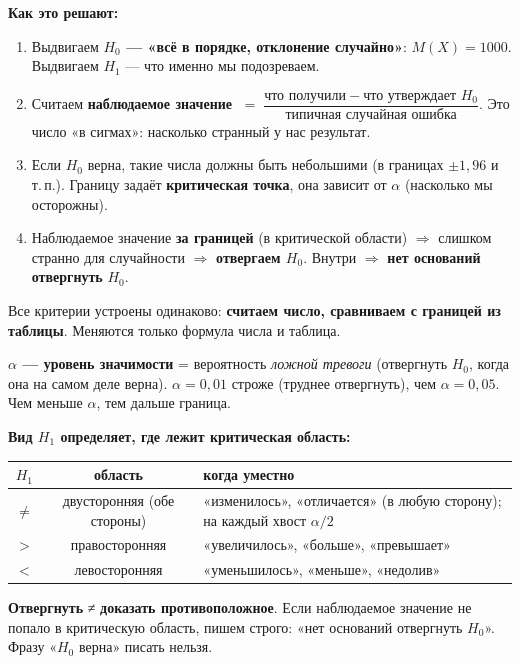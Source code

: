 \documentclass[a4paper,11pt]{extarticle}
\begin{document}
\textbf{Как это решают:}
\begin{enumerate}
\item Выдвигаем \textbf{$H_0$ --- «всё в порядке, отклонение случайно»}: $M(X)=1000$. Выдвигаем $H_1$ --- что именно мы подозреваем.
\item Считаем \textbf{наблюдаемое значение} $\;=\;\dfrac{\text{что получили}-\text{что утверждает }H_0}{\text{типичная случайная ошибка}}$. Это число «в сигмах»: насколько странный у нас результат.
\item Если $H_0$ верна, такие числа должны быть небольшими (в границах $\pm1{,}96$ и т.\,п.). Границу задаёт \textbf{критическая точка}, она зависит от $\alpha$ (насколько мы осторожны).
\item Наблюдаемое значение \textbf{за границей} (в критической области) $\Rightarrow$ слишком странно для случайности $\Rightarrow$ \textbf{отвергаем $H_0$}. Внутри $\Rightarrow$ \textbf{нет оснований отвергнуть} $H_0$.
\end{enumerate}
\begin{idea}
Все критерии устроены одинаково: \textbf{считаем число, сравниваем с границей из таблицы}. Меняются только формула числа и таблица.
\end{idea}

\textbf{$\alpha$ --- уровень значимости} = вероятность \emph{ложной тревоги} (отвергнуть $H_0$, когда она на самом деле верна). $\alpha=0{,}01$ строже (труднее отвергнуть), чем $\alpha=0{,}05$. Чем меньше $\alpha$, тем дальше граница.

\textbf{Вид $H_1$ определяет, где лежит критическая область:}
\begin{center}
\begin{tabular}{|c|c|p{7.4cm}|}\hline
$H_1$ & область & когда уместно\\\hline
$\ne$ & двусторонняя (обе стороны) & «изменилось», «отличается» (в любую сторону); на каждый хвост $\alpha/2$\\\hline
$>$ & правосторонняя & «увеличилось», «больше», «превышает»\\\hline
$<$ & левосторонняя & «уменьшилось», «меньше», «недолив»\\\hline
\end{tabular}
\end{center}
\begin{warn}
\textbf{Отвергнуть} ≠ \textbf{доказать противоположное}. Если наблюдаемое значение не попало в критическую область, пишем строго: «нет оснований отвергнуть $H_0$». Фразу «$H_0$ верна» писать нельзя.
\end{warn}
\end{document}
